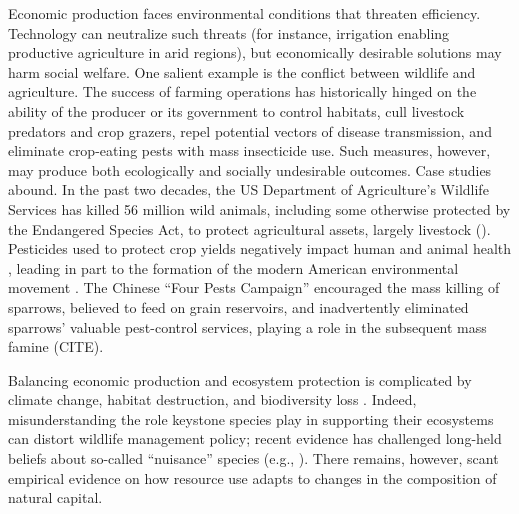 

Economic production faces environmental conditions that threaten efficiency. Technology can neutralize such threats (for instance, irrigation enabling productive agriculture in arid regions), but economically desirable solutions may harm social welfare. One salient example is the conflict between wildlife and agriculture. The success of farming operations has historically hinged on the ability of the producer or its government to control habitats, cull livestock predators and crop grazers, repel potential vectors of disease transmission, and eliminate crop-eating pests with mass insecticide use. Such measures, however, may produce both ecologically and socially undesirable outcomes. Case studies abound. In the past two decades, the US Department of Agriculture's Wildlife Services has killed 56 million wild animals, including some otherwise protected by the Endangered Species Act, to protect agricultural assets, largely livestock (\cite{torrella_inside_2024}). Pesticides used to protect crop yields negatively impact human and animal health \citep{larsen_agricultural_2017}, leading in part to the formation of the modern American environmental movement \citep{woodwell_broken_1984}. The Chinese ``Four Pests Campaign'' encouraged the mass killing of sparrows, believed to feed on grain reservoirs, and inadvertently eliminated sparrows' valuable pest-control services, playing a role in the subsequent mass famine (CITE). 

Balancing economic production and ecosystem protection is complicated by climate change, habitat destruction, and biodiversity loss \citep{cardinale_biodiversity_2012}. Indeed, misunderstanding the role keystone species play in supporting their ecosystems can distort wildlife management policy; recent evidence has challenged long-held beliefs about so-called ``nuisance'' species (e.g., \cite{raynor_wolves_2021}). There remains, however, scant empirical evidence on how resource use adapts to changes in the composition of natural capital.

